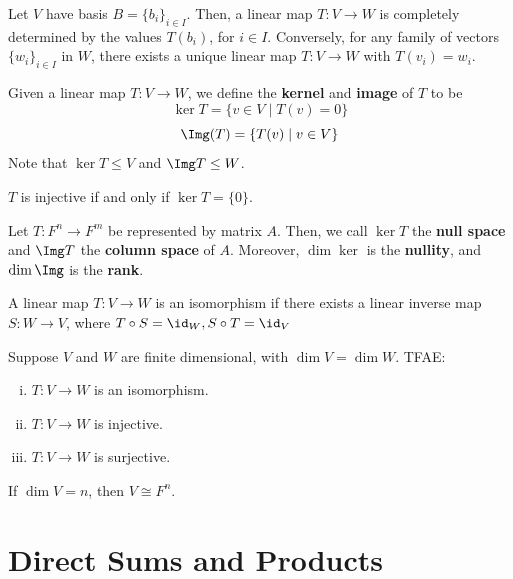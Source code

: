 \begin{rmk}
    Let $V$ have basis $B=\{b_i\}_{i \in I}$. Then, a linear map $T:V \to W$ is completely determined by the values $T(b_i)$, for $i \in I$. Conversely, for any family of vectors $\{w_i\}_{i \in I}$ in $W$, there exists a unique linear map $T:V \to W$ with $T(v_i)=w_i$.
\end{rmk}

\begin{defn}
    Given a linear map $T:V \to W$, we define the \textbf{kernel} and \textbf{image} of $T$ to be
    $$\ker T = \{v \in V \mid T(v)=0\}$$
    $$\Img (T) = \{T(v) \mid v \in V\}$$
    Note that $\ker T \leq V$ and $\Img T \leq W$.
\end{defn}

\begin{prop}
    $T$ is injective if and only if $\ker T = \{0\}$.
\end{prop}

\begin{defn}
    Let $T: F^n \to F^m$ be represented by matrix $A$. Then, we call $\ker T$ the \textbf{null space} and $\Img T$ the \textbf{column space} of $A$. Moreover, $\dim \ker$ is the \textbf{nullity}, and $\dim \Img$ is the \textbf{rank}.
\end{defn}

\begin{defn}
    A linear map $T:V \to W$ is an isomorphism if there exists a linear inverse map $S:W \to V$, where $T\circ S=\id _W,S \circ T= \id_V$
\end{defn}

\begin{prop}
    Suppose $V$ and $W$ are finite dimensional, with $\dim V =\dim W$. TFAE:
    \begin{enumerate}[(i)]
        \item $T:V \to W$ is an isomorphism.
        \item $T:V \to W$ is injective.
        \item $T:V \to W$ is surjective.
    \end{enumerate}
\end{prop}

\begin{thm}
    If $\dim V = n$, then $V \cong F^n$.
\end{thm}

\section{Direct Sums and Products}

